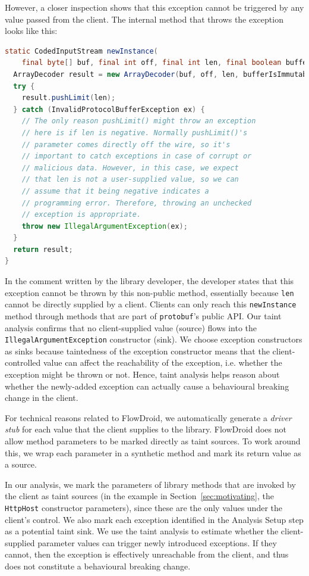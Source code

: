 However, a closer inspection shows that this exception cannot be triggered by any value passed from the client. The internal method that throws the exception looks like this:

\begin{lstlisting}[language=Java]
static CodedInputStream newInstance(
    final byte[] buf, final int off, final int len, final boolean bufferIsImmutable) {
  ArrayDecoder result = new ArrayDecoder(buf, off, len, bufferIsImmutable);
  try {
    result.pushLimit(len);
  } catch (InvalidProtocolBufferException ex) {
    // The only reason pushLimit() might throw an exception
    // here is if len is negative. Normally pushLimit()'s
    // parameter comes directly off the wire, so it's 
    // important to catch exceptions in case of corrupt or
    // malicious data. However, in this case, we expect 
    // that len is not a user-supplied value, so we can 
    // assume that it being negative indicates a 
    // programming error. Therefore, throwing an unchecked 
    // exception is appropriate.
    throw new IllegalArgumentException(ex);
  }
  return result;
}
\end{lstlisting}

In the comment written by the library developer, the developer states that this exception cannot be thrown by this non-public method, essentially because \texttt{len} cannot be directly supplied by a client. Clients can only reach this \texttt{newInstance} method through methods that are part of \texttt{protobuf}'s public API. Our taint analysis confirms that no client-supplied value (source) flows into the \texttt{IllegalArgumentException} constructor (sink). We choose exception constructors as sinks because taintedness of the exception constructor means that the client-controlled value can affect the reachability of the exception, i.e. whether the exception might be thrown or not. Hence, taint analysis helps reason about whether the newly-added exception can actually cause a behavioural breaking change in the client.

For technical reasons related to FlowDroid, we automatically generate a \textit{driver stub} for each value that the client supplies to the library. FlowDroid does not allow method parameters to be marked directly as taint sources. To work around this, we wrap each parameter in a synthetic method and mark its return value as a source.

In our analysis, we mark the parameters of library methods that are invoked by the client as taint sources (in the example in Section~\ref{sec:motivating}, the \texttt{HttpHost} constructor parameters), since these are the only values under the client’s control. We also mark each exception identified in the Analysis Setup step as a potential taint sink. We use the taint analysis to estimate whether the client-supplied parameter values can trigger newly introduced exceptions. If they cannot, then the exception is effectively unreachable from the client, and thus does not constitute a behavioural breaking change. 

